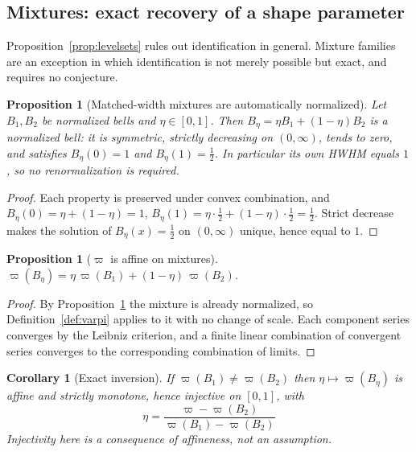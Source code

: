 \documentclass[11pt]{article}
\theoremstyle{definition}
\theoremstyle{plain}
\newtheorem{proposition}[definition]{Proposition}
\newtheorem{corollary}[definition]{Corollary}
\theoremstyle{remark}
\begin{document}
\subsection{Mixtures: exact recovery of a shape parameter}

Proposition~\ref{prop:levelsets} rules out identification in general. Mixture families
are an exception in which identification is not merely possible but exact, and requires
no conjecture.

\begin{proposition}[Matched-width mixtures are automatically normalized]\label{prop:mixnorm}
Let $B_1,B_2$ be normalized bells and $\eta\in[0,1]$. Then
$B_\eta=\eta B_1+(1-\eta)B_2$ is a normalized bell: it is symmetric, strictly decreasing
on $(0,\infty)$, tends to zero, and satisfies $B_\eta(0)=1$ and $B_\eta(1)=\tfrac12$. In
particular its own HWHM equals $1$, so no renormalization is required.
\end{proposition}

\begin{proof}
Each property is preserved under convex combination, and
$B_\eta(0)=\eta+(1-\eta)=1$, $B_\eta(1)=\eta\cdot\tfrac12+(1-\eta)\cdot\tfrac12=\tfrac12$.
Strict decrease makes the solution of $B_\eta(x)=\tfrac12$ on $(0,\infty)$ unique, hence
equal to $1$.
\end{proof}

\begin{proposition}[$\varpi$ is affine on mixtures]\label{prop:affine}
$\varpi(B_\eta)=\eta\,\varpi(B_1)+(1-\eta)\,\varpi(B_2)$.
\end{proposition}

\begin{proof}
By Proposition~\ref{prop:mixnorm} the mixture is already normalized, so
Definition~\ref{def:varpi} applies to it with no change of scale. Each component series
converges by the Leibniz criterion, and a finite linear combination of convergent series
converges to the corresponding combination of limits.
\end{proof}

\begin{corollary}[Exact inversion]\label{cor:inv}
If $\varpi(B_1)\neq\varpi(B_2)$ then $\eta\mapsto\varpi(B_\eta)$ is affine and strictly
monotone, hence injective on $[0,1]$, with
\[
\boxed{\;\eta=\frac{\varpi-\varpi(B_2)}{\varpi(B_1)-\varpi(B_2)}\;}
\]
Injectivity here is a consequence of affineness, not an assumption.
\end{corollary}
\end{document}
